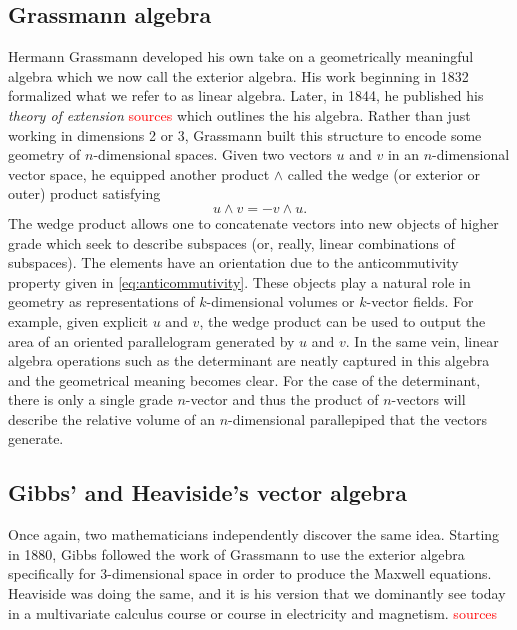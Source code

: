 \documentclass[12pt]{article}
\begin{document}
\subsection{Grassmann algebra}

Hermann Grassmann developed his own take on a geometrically meaningful algebra which we now call the exterior algebra. His work beginning in 1832 formalized what we refer to as linear algebra. Later, in 1844, he published his \emph{theory of extension} \textcolor{red}{sources} which outlines the his algebra. Rather than just working in dimensions 2 or 3, Grassmann built this structure to encode some geometry of $n$-dimensional spaces. Given two vectors $u$ and $v$ in an $n$-dimensional vector space, he equipped another product $\wedge$ called the wedge (or exterior or outer) product satisfying
\begin{equation}
\label{eq:anticommutivity}
u \wedge v = - v \wedge u.
\end{equation}
The wedge product allows one to concatenate vectors into new objects of higher grade which seek to describe subspaces (or, really, linear combinations of subspaces). The elements have an orientation due to the anticommutivity property given in \cref{eq:anticommutivity}. These objects play a natural role in geometry as representations of $k$-dimensional volumes or $k$-vector fields. For example, given explicit $u$ and $v$, the wedge product can be used to output the area of an oriented parallelogram generated by $u$ and $v$. In the same vein, linear algebra operations such as the determinant are neatly captured in this algebra and the geometrical meaning becomes clear. For the case of the determinant, there is only a single grade $n$-vector and thus the product of $n$-vectors will describe the relative volume of an $n$-dimensional parallepiped that the vectors generate.

\subsection{Gibbs' and Heaviside's vector algebra}

Once again, two mathematicians independently discover the same idea. Starting in 1880, Gibbs followed the work of Grassmann to use the exterior algebra specifically for 3-dimensional space in order to produce the Maxwell equations. Heaviside was doing the same, and it is his version that we dominantly see today in a multivariate calculus course or course in electricity and magnetism. \textcolor{red}{sources}
\end{document}
